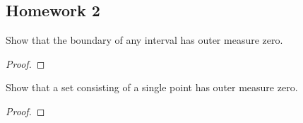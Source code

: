 \subsection{Homework 2}
\begin{problem}
Show that the boundary of any interval has outer measure zero.
\end{problem}
\begin{proof}
\end{proof}

\begin{problem}
Show that a set consisting of a single point has outer measure zero.
\end{problem}
\begin{proof}
\end{proof}

